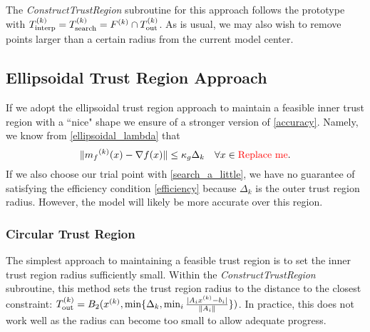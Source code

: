 The \emph{ConstructTrustRegion} subroutine for this approach follows the prototype with ${T_{\text{interp}}^{(k)}} = {T_{\text{search}}^{(k)}} = {F}^{(k)} \cap {T_{\text{out}}^{(k)}} $.
As is usual, we may also wish to remove points larger than a certain radius from the current model center.






\subsection{Ellipsoidal Trust Region Approach}

If we adopt the ellipsoidal trust region approach to maintain a feasible inner trust region with a ``nice" shape we ensure of a stronger version of \cref{accuracy}.
Namely, we know from \cref{ellipsoidal_lambda} that 
\[
    \|{{m}_f}^{(k)}(x) - \nabla f(x) \| \le \kappa_g \Delta_{k} \quad \forall x \in \color{red} \text{Replace me} \color{black}.
\]
If we also choose our trial point with \cref{search_a_little}, we have no guarantee of satisfying the efficiency condition \cref{efficiency} because $\Delta_k$ is the outer trust region radius.
However, the model will likely be more accurate over this region.


\subsubsection{Circular Trust Region}
The simplest approach to maintaining a feasible trust region is to set the inner trust region radius sufficiently small.
Within the \emph{ConstructTrustRegion} subroutine, this method sets the trust region radius to the distance to the closest constraint:
${T_{\text{out}}^{(k)}} = B_2({x}^{(k)}, \min\{\Delta_k, \min_{i}\frac{|A_i{x}^{(k)} - b_i|}{\|A_i\|} \})$.
In practice, this does not work well as the radius can become too small to allow adequate progress.


